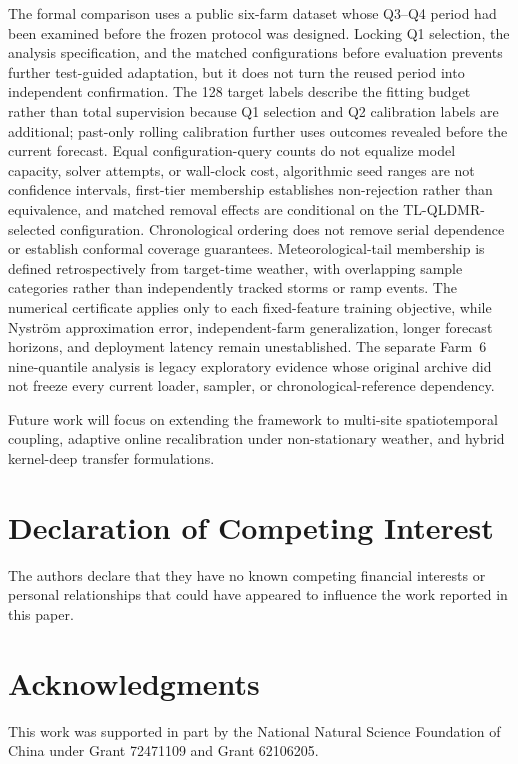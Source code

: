 \documentclass[a4paper]{cas-sc}
\begin{document}
{\color{blue}The formal comparison uses a public six-farm dataset whose Q3--Q4 period had been examined before the frozen protocol was designed. Locking Q1 selection, the analysis specification, and the matched configurations before evaluation prevents further test-guided adaptation, but it does not turn the reused period into independent confirmation. The 128 target labels describe the fitting budget rather than total supervision because Q1 selection and Q2 calibration labels are additional; past-only rolling calibration further uses outcomes revealed before the current forecast. Equal configuration-query counts do not equalize model capacity, solver attempts, or wall-clock cost, algorithmic seed ranges are not confidence intervals, first-tier membership establishes non-rejection rather than equivalence, and matched removal effects are conditional on the TL-QLDMR-selected configuration. Chronological ordering does not remove serial dependence or establish conformal coverage guarantees. Meteorological-tail membership is defined retrospectively from target-time weather, with overlapping sample categories rather than independently tracked storms or ramp events. The numerical certificate applies only to each fixed-feature training objective, while Nystr\"{o}m approximation error, independent-farm generalization, longer forecast horizons, and deployment latency remain unestablished. The separate Farm~6 nine-quantile analysis is legacy exploratory evidence whose original archive did not freeze every current loader, sampler, or chronological-reference dependency.}


Future work will focus on extending the framework to multi-site spatiotemporal coupling, adaptive online recalibration under non-stationary weather, and hybrid kernel-deep transfer formulations.

\FloatBarrier
\appendix


\FloatBarrier


\printcredits


\section*{Declaration of Competing Interest}
The authors declare that they have no known competing financial interests or personal relationships that could have appeared to influence the work reported in this paper.


\section*{Acknowledgments}
This work was supported in part by the National Natural Science Foundation of China under Grant 72471109 and Grant 62106205.






\end{document}
